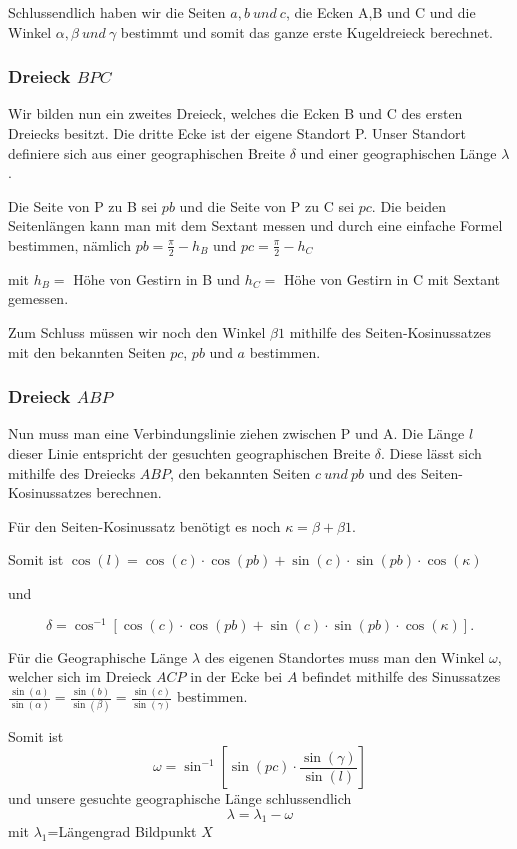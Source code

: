 Schlussendlich haben wir die Seiten $a,b\ und \ c$, die Ecken A,B und C und die Winkel $\alpha, \beta \ und \ \gamma$ bestimmt und somit das ganze erste Kugeldreieck berechnet.

\subsubsection{Dreieck $BPC$}
Wir bilden nun ein zweites Dreieck, welches die Ecken B und C des ersten Dreiecks besitzt. 
Die dritte Ecke ist der eigene Standort P.
Unser Standort definiere sich aus einer geographischen Breite $\delta$ und einer geographischen Länge $\lambda$. 

Die Seite von P zu B sei $pb$ und die Seite von P zu C sei $pc$.
Die beiden Seitenlängen kann man mit dem Sextant messen und durch eine einfache Formel bestimmen, nämlich $pb=\frac{\pi}{2} - h_{B}$ und $pc=\frac{\pi}{2} - h_{C}$ 

mit $h_B=$ Höhe von Gestirn in B und $h_C=$ Höhe von Gestirn in C mit Sextant gemessen.

Zum Schluss müssen wir noch den Winkel $\beta1$ mithilfe des Seiten-Kosinussatzes  mit den bekannten Seiten $pc$, $pb$ und $a$ bestimmen.
\subsubsection{Dreieck $ABP$}
Nun muss man eine Verbindungslinie ziehen zwischen P und A. Die Länge $l$ dieser Linie entspricht der gesuchten geographischen Breite $\delta$. Diese lässt sich mithilfe des Dreiecks $ABP$, den bekannten Seiten $c\ und \ pb$ und des Seiten-Kosinussatzes berechnen.

Für den Seiten-Kosinussatz benötigt es noch $\kappa=\beta + \beta1$.

Somit ist $\cos(l) = \cos(c)\cdot \cos(pb) + \sin(c) \cdot \sin(pb) \cdot \cos(\kappa)$

und

\[
\delta  =\cos^{-1} [\cos(c) \cdot \cos(pb) + \sin(c) \cdot \sin(pb) \cdot \cos(\kappa)].
\]

Für die Geographische Länge $\lambda$ des eigenen Standortes muss man den Winkel $\omega$, welcher sich im Dreieck $ACP$ in der Ecke bei $A$ befindet mithilfe des Sinussatzes $\frac{\sin (a)}{\sin (\alpha)} =\frac{\sin (b)}{\sin (\beta)} = \frac{\sin (c)}{\sin (\gamma)}$ bestimmen. 

Somit ist \[ \omega=\sin^{-1}[\sin(pc) \cdot \frac{\sin(\gamma)}{\sin(l)}] \]und unsere gesuchte geographische Länge schlussendlich 
\[\lambda=\lambda_1 - \omega\]
mit $\lambda_1$=Längengrad Bildpunkt $X$
